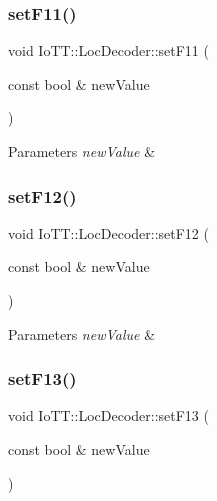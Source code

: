 \subsubsection{\texorpdfstring{set\+F11()}{setF11()}}
{\footnotesize\ttfamily void Io\+T\+T\+::\+Loc\+Decoder\+::set\+F11 (\begin{DoxyParamCaption}\item[{const bool \&}]{new\+Value }\end{DoxyParamCaption})}


\begin{DoxyParams}{Parameters}
{\em new\+Value} & \\
\hline
\end{DoxyParams}
\mbox{\label{classIoTT_1_1LocDecoder_ae8eb191639ba1ee137cb4c1ee07de2c9}} 
\subsubsection{\texorpdfstring{set\+F12()}{setF12()}}
{\footnotesize\ttfamily void Io\+T\+T\+::\+Loc\+Decoder\+::set\+F12 (\begin{DoxyParamCaption}\item[{const bool \&}]{new\+Value }\end{DoxyParamCaption})}


\begin{DoxyParams}{Parameters}
{\em new\+Value} & \\
\hline
\end{DoxyParams}
\mbox{\label{classIoTT_1_1LocDecoder_a5528d28f81227fc6d88de6228c045480}} 
\subsubsection{\texorpdfstring{set\+F13()}{setF13()}}
{\footnotesize\ttfamily void Io\+T\+T\+::\+Loc\+Decoder\+::set\+F13 (\begin{DoxyParamCaption}\item[{const bool \&}]{new\+Value }\end{DoxyParamCaption})}


